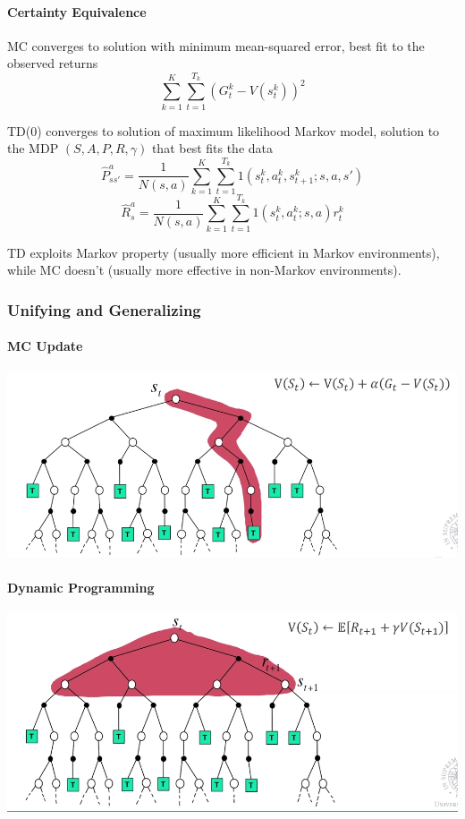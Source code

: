 \documentclass[10pt]{report}
\begin{document}
\paragraph{Certainty Equivalence}
\begin{list}{}{}
	\item MC converges to solution with minimum mean-squared error, best fit to the observed returns
	$$\sum_{k=1}^K\sum_{t=1}^{T_k}\left(G_t^k-V(s_t^k)\right)^2$$
	\item TD(0) converges to solution of maximum likelihood Markov model, solution to the MDP $(S, A, P, R, \gamma)$ that best fits the data
	$$\hat{P}_{ss'}^a = \frac{1}{N(s,a)}\sum_{k=1}^K\sum_{t=1}^{T_k} 1(s_t^k,a_t^k,s_{t+1}^k; s, a, s')$$
	$$\hat{R}_s^a = \frac{1}{N(s,a)}\sum_{k=1}^K\sum_{t=1}^{T_k} 1(s_t^k,a_t^k;s,a)r_t^k$$
\end{list}
TD exploits Markov property (usually more efficient in Markov environments), while MC doesn't (usually more effective in non-Markov environments).
\subsubsection{Unifying and Generalizing}
\paragraph{MC Update}
\begin{center}
	\includegraphics[scale=0.5]{166.png}
\end{center}
\paragraph{Dynamic Programming}
\begin{center}
	\includegraphics[scale=0.5]{167.png}
\end{center}
\end{document}
